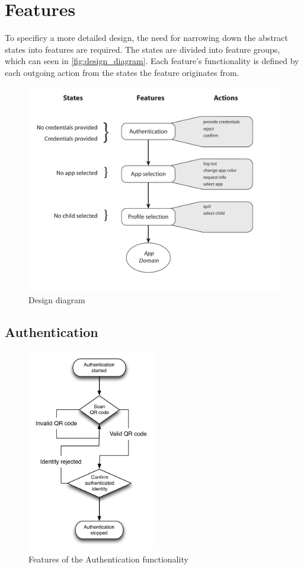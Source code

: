 \section{Features}
To specificy a more detailed design, the need for narrowing down the abstract states into features are required. The states are divided into feature groups, which can seen in \autoref{fig:design_diagram}. Each feature's functionality is defined by each outgoing action from the states the feature originates from. 
\begin{figure}[h]
	\centering
	\includegraphics[width=1\textwidth]{gfx/design_diagram.pdf}
	\caption{Design diagram}
	\label{fig:design_diagram}
\end{figure}
\subsection{Authentication}
\begin{figure}[h]
	\centering
	\includegraphics[width=0.5\textwidth]{gfx/authentication_design.pdf}
	\caption{Features of the Authentication functionality}
	\label{fig:authentication_design}
\end{figure}
